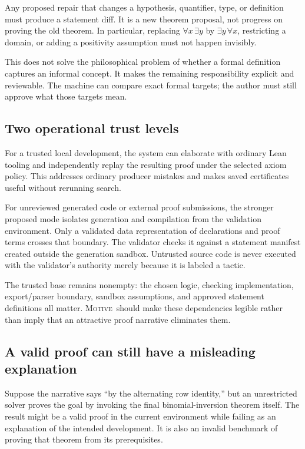 \documentclass[11pt,a4paper]{article}
\newcommand{\Motive}{\textnormal{\textsc{Motive}}}
\theoremstyle{remark}
\begin{document}
Any proposed repair that changes a hypothesis, quantifier, type, or definition must produce a statement diff. It is a new theorem proposal, not progress on proving the old theorem. In particular, replacing $\forall x\,\exists y$ by $\exists y\,\forall x$, restricting a domain, or adding a positivity assumption must not happen invisibly.

This does not solve the philosophical problem of whether a formal definition captures an informal concept. It makes the remaining responsibility explicit and reviewable. The machine can compare exact formal targets; the author must still approve what those targets mean.

\subsection{Two operational trust levels}
For a trusted local development, the system can elaborate with ordinary Lean tooling and independently replay the resulting proof under the selected axiom policy. This addresses ordinary producer mistakes and makes saved certificates useful without rerunning search.

For unreviewed generated code or external proof submissions, the stronger proposed mode isolates generation and compilation from the validation environment. Only a validated data representation of declarations and proof terms crosses that boundary. The validator checks it against a statement manifest created outside the generation sandbox. Untrusted source code is never executed with the validator's authority merely because it is labeled a tactic.

The trusted base remains nonempty: the chosen logic, checking implementation, export/parser boundary, sandbox assumptions, and approved statement definitions all matter. \Motive\ should make these dependencies legible rather than imply that an attractive proof narrative eliminates them.

\subsection{A valid proof can still have a misleading explanation}
Suppose the narrative says ``by the alternating row identity,'' but an unrestricted solver proves the goal by invoking the final binomial-inversion theorem itself. The result might be a valid proof in the current environment while failing as an explanation of the intended development. It is also an invalid benchmark of proving that theorem from its prerequisites.
\end{document}
